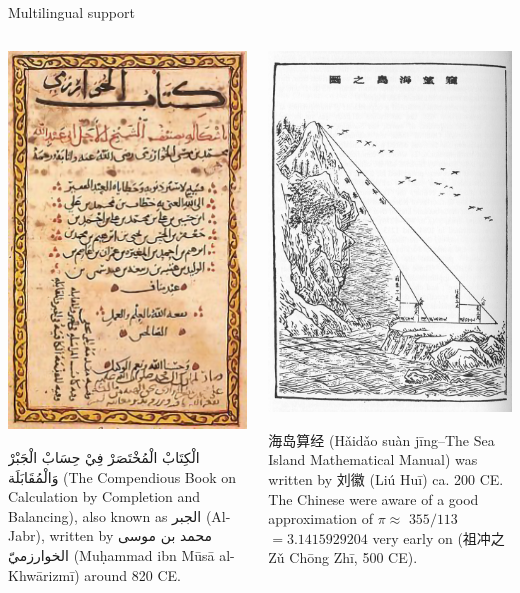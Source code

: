\documentclass[,aspectratio=43]{beamer}
\begin{document}
\begin{frame}{Multilingual support}
\protect\hypertarget{multilingual-support}{}
\vspace{-2em}

\begin{columns}[T]
\begin{column}{0.48\textwidth}
\begin{center}\includegraphics[width=0.4\linewidth]{figure/00-aljabr} \end{center}

\textarabic{
الْكِتَابْ الْمُخْتَصَرْ فِيْ حِسَابْ الْجَبْرْ وَالْمُقَابَلَة
} (The Compendious Book on Calculation by Completion and Balancing),
also known as \textarabic{الجبر} (Al-Jabr), written by \textarabic{
محمد بن موسى الخوارزميّ
} (Muḥammad ibn Mūsā al-Khwārizmī) around 820 CE.
\end{column}

\begin{column}{0.48\textwidth}
\begin{center}\includegraphics[width=0.4\linewidth]{figure/00-haidaosuanjing} \end{center}

海岛算经 (Hǎidǎo suàn jīng--The Sea Island Mathematical Manual) was
written by 刘徽 (Liú Huī) ca. 200 CE. The Chinese were aware of a good
approximation of \(\pi\approx\) \(355/113\) \(= 3.1415929204\) very
early on (祖冲之 Zǔ Chōng Zhī, 500 CE).
\end{column}
\end{columns}
\end{frame}
\end{document}
